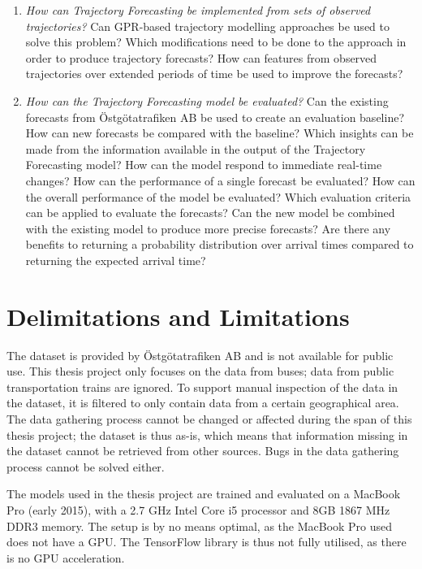 \begin{description}
\begin{enumerate}
    \item \textit{How can Trajectory Forecasting be implemented from sets of observed trajectories?} \newline
    Can GPR-based trajectory modelling approaches be used to solve this problem?
    Which modifications need to be done to the approach in order to produce trajectory forecasts?
    How can features from observed trajectories over extended periods of time be used to improve the forecasts?

    \item \textit{How can the Trajectory Forecasting model be evaluated?} \newline
    Can the existing forecasts from Östgötatrafiken AB be used to create an evaluation baseline?
    How can new forecasts be compared with the baseline?
    Which insights can be made from the information available in the output of the Trajectory Forecasting model?
    How can the model respond to immediate real-time changes?
    How can the performance of a single forecast be evaluated?
    How can the overall performance of the model be evaluated?
    Which evaluation criteria can be applied to evaluate the forecasts?
    Can the new model be combined with the existing model to produce more precise forecasts?
    Are there any benefits to returning a probability distribution over arrival times compared to returning the expected arrival time?
  \end{enumerate}
\end{description}

\section{Delimitations and Limitations}
\label{sec:delimitations}
The dataset is provided by Östgötatrafiken AB and is not available for public use.
This thesis project only focuses on the data from buses; data from public transportation trains are ignored.
To support manual inspection of the data in the dataset, it is filtered to only contain data from a certain geographical area.
The data gathering process cannot be changed or affected during the span of this thesis project; the dataset is thus as-is, which means that information missing in the dataset cannot be retrieved from other sources.
Bugs in the data gathering process cannot be solved either.

The models used in the thesis project are trained and evaluated on a MacBook Pro (early 2015), with a 2.7 GHz Intel Core i5 processor and 8GB 1867 MHz DDR3 memory.
The setup is by no means optimal, as the MacBook Pro used does not have a GPU.
The TensorFlow library is thus not fully utilised, as there is no GPU acceleration.

